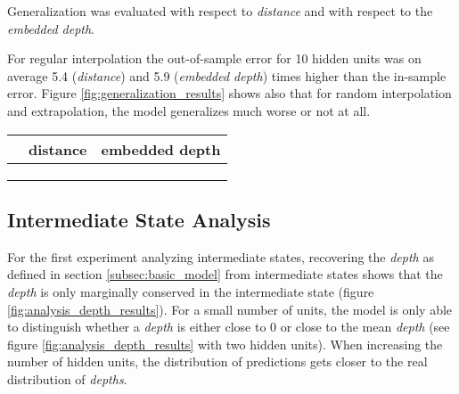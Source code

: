 \documentclass[11pt,a4paper]{article}
\newlength\figureheight
\newlength\figurewidth
\begin{document}
Generalization was evaluated with respect to \emph{distance} and with respect to the \emph{embedded depth}.

For regular interpolation the out-of-sample error for 10 hidden units was on average 5.4 (\emph{distance}) and 5.9 (\emph{embedded depth}) times higher than the in-sample error. Figure \ref{fig:generalization_results} shows also that for random interpolation and extrapolation, the model generalizes much worse or not at all.

\setlength\figureheight{4cm}
\setlength{}
\begin{figure*}[ht]
    \bgroup
    \def\arraystretch{1.5}%
    \begin{tabular}{c|c c}
        & distance & embedded depth\\
        \hline
        \raisebox{0.15in}{\rotatebox{90}{regular interpolation}} &
         & \\
        \raisebox{0.15in}{\rotatebox{90}{random interpolation}} &
         & \\
        \raisebox{0.45in}{\rotatebox{90}{extrapolation}} &  &
        
    \end{tabular}
    \egroup
    \caption{Test for generalization: The error rate of the model with 10 hidden units if only half of the corpus is systematically selected for training (in-sample), while during testing also the left out \emph{distances} / \emph{embedded depths} were considered (out-of-sample).}%
    \label{fig:generalization_results}%
\end{figure*}

\subsection{Intermediate State Analysis}
\label{subsec:intermediate_state_analysis}

For the first experiment analyzing intermediate states, recovering the \emph{depth} as defined in section \ref{subsec:basic_model} from intermediate states shows that the \emph{depth} is only marginally conserved in the intermediate state (figure \ref{fig:analysis_depth_results}). For a small number of units, the model is only able to distinguish whether a \emph{depth} is either close to $0$ or close to the mean \emph{depth} (see figure \ref{fig:analysis_depth_results} with two hidden units). When increasing the number of hidden units, the distribution of predictions gets closer to the real distribution of \emph{depths}.
\end{document}
